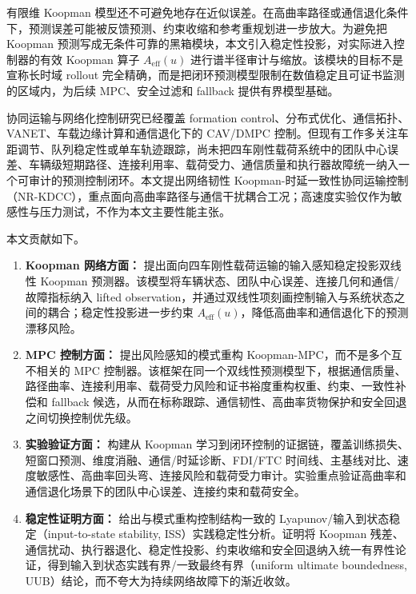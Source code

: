 \documentclass[twocolumn,3p,times,procedia]{elsarticle}
\newcommand{\Method}{NR-KDCC}
\begin{document}
有限维 Koopman 模型还不可避免地存在近似误差。在高曲率路径或通信退化条件下，预测误差可能被反馈预测、约束收缩和参考重规划进一步放大。为避免把 Koopman 预测写成无条件可靠的黑箱模块，本文引入稳定性投影，对实际进入控制器的有效 Koopman 算子 $A_{\mathrm{eff}}(u)$ 进行谱半径审计与缩放。该模块的目标不是宣称长时域 rollout 完全精确，而是把闭环预测模型限制在数值稳定且可证书监测的区域内，为后续 MPC、安全过滤和 fallback 提供有界模型基础。

协同运输与网络化控制研究已经覆盖 formation control、分布式优化、通信拓扑、VANET、车载边缘计算和通信退化下的 CAV/DMPC 控制\cite{an2023multiRobotCommTransport,tan2022mlVehicularDcn,zhao2025blockchainVanetDcn,wu2025drlVecDcn,bian2025markovPacketLossDMPC,dosDMPC2024isa,robustCommunicationLoss2025trb}。但现有工作多关注车距调节、队列稳定性或单车轨迹跟踪，尚未把四车刚性载荷系统中的团队中心误差、车辆级短期路径、连接利用率、载荷受力、通信质量和执行器故障统一纳入一个可审计的预测控制闭环。本文提出网络韧性 Koopman-时延一致性协同运输控制（\Method{}），重点面向高曲率路径与通信干扰耦合工况；高速度实验仅作为敏感性与压力测试，不作为本文主要性能主张。

本文贡献如下。
\begin{enumerate}
\item \textbf{Koopman 网络方面：} 提出面向四车刚性载荷运输的输入感知稳定投影双线性 Koopman 预测器。该模型将车辆状态、团队中心误差、连接几何和通信/故障指标纳入 lifted observation，并通过双线性项刻画控制输入与系统状态之间的耦合；稳定性投影进一步约束 $A_{\mathrm{eff}}(u)$，降低高曲率和通信退化下的预测漂移风险。
\item \textbf{MPC 控制方面：} 提出风险感知的模式重构 Koopman-MPC，而不是多个互不相关的 MPC 控制器。该框架在同一个双线性预测模型下，根据通信质量、路径曲率、连接利用率、载荷受力风险和证书裕度重构权重、约束、一致性补偿和 fallback 候选，从而在标称跟踪、通信韧性、高曲率货物保护和安全回退之间切换控制优先级。
\item \textbf{实验验证方面：} 构建从 Koopman 学习到闭环控制的证据链，覆盖训练损失、短窗口预测、维度消融、通信/时延诊断、FDI/FTC 时间线、主基线对比、速度敏感性、高曲率回头弯、连接风险和载荷受力审计。实验重点验证高曲率和通信退化场景下的团队中心误差、连接约束和载荷安全。
\item \textbf{稳定性证明方面：} 给出与模式重构控制结构一致的 Lyapunov/输入到状态稳定（input-to-state stability, ISS）实践稳定性分析。证明将 Koopman 残差、通信扰动、执行器退化、稳定性投影、约束收缩和安全回退纳入统一有界性论证，得到输入到状态实践有界/一致最终有界（uniform ultimate boundedness, UUB）结论，而不夸大为持续网络故障下的渐近收敛。
\end{enumerate}
\end{document}
